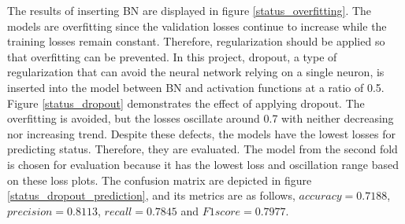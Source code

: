 \documentclass[12pt,twoside]{report}
\begin{document}
The results of inserting BN are displayed in figure \ref{status_overfitting}. The models are overfitting since the validation losses continue to increase while the training losses remain constant. Therefore, regularization should be applied so that overfitting can be prevented. In this project, dropout, a type of regularization that can avoid the neural network relying on a single neuron, is inserted into the model between BN and activation functions at a ratio of 0.5. 
\\

Figure \ref{status_dropout} demonstrates the effect of applying dropout. The overfitting is avoided, but the losses oscillate around 0.7 with neither decreasing nor increasing trend. Despite these defects, the models have the lowest losses for predicting status. Therefore, they are evaluated. The model from the second fold is chosen for evaluation because it has the lowest loss and oscillation range based on these loss plots. The confusion matrix are depicted in figure \ref{status_dropout_prediction}, and its metrics are as follows, $accuracy = 0.7188$, $precision = 0.8113$, $recall = 0.7845$ and $F1 score = 0.7977$.
\\
\end{document}
